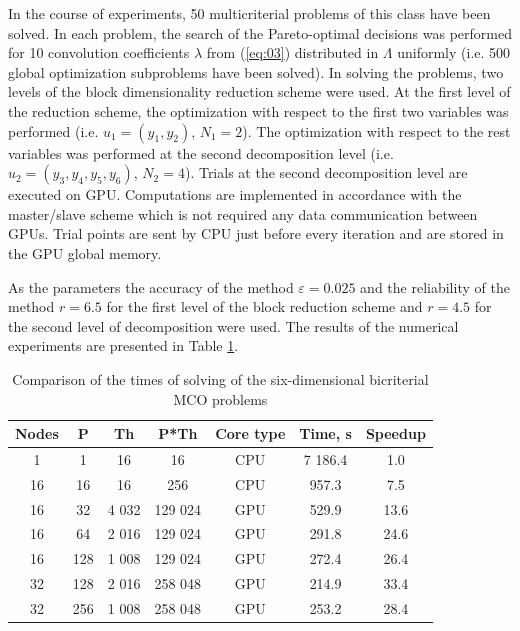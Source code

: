 \documentclass[runningheads]{llncs}
\begin{document}
In the course of experiments, 50 multicriterial problems of this class have been solved. In each problem, the search of the Pareto-optimal decisions was performed for 10 convolution coefficients $\lambda$ from (\ref{eq:03}) distributed in $\Lambda$ uniformly (i.e. 500 global optimization subproblems have been solved). In solving the problems, two levels of the block dimensionality reduction scheme were used. At the first level of the reduction scheme, the optimization with respect to the first two variables was performed (i.e. $u_1 = (y_1, y_2)$, $N_1=2$). The optimization with respect to the rest variables was performed at the second decomposition level (i.e. $u_2 = (y_3, y_4, y_5, y_6)$, $N_2=4$). Trials at the second decomposition level are executed on GPU. Computations are implemented in accordance with the master/slave scheme which is not required any data communication between GPUs. Trial points are sent by CPU just before every iteration and are stored in the GPU global memory.

As the parameters the accuracy of the method $\varepsilon=0.025$ and the reliability of the method $r=6.5$ for the first level of the block reduction scheme and $r=4.5$ for the second level of decomposition were used. The results of the numerical experiments are presented in Table \ref{tab:02}.

\begin{table}[htbp]
\centering
\caption{Comparison of the times of solving of the six-dimensional bicriterial MCO problems}
\label{tab:02}
\begin{tabular}{ccccccc}
\hline
\textbf{Nodes} & \textbf{P} & \textbf{Th} & \textbf{P*Th} & \textbf{Core type} & \textbf{Time, s} & \textbf{Speedup} \\ \hline
1              & 1          & 16          & 16            & CPU                   & 7 186.4          & 1.0              \\
16             & 16         & 16          & 256           & CPU                   & 957.3            & 7.5              \\
16             & 32         & 4 032       & 129 024       & GPU                   & 529.9            & 13.6             \\
16             & 64         & 2 016       & 129 024       & GPU                   & 291.8            & 24.6             \\
16             & 128        & 1 008       & 129 024       & GPU                   & 272.4            & 26.4             \\
32             & 128        & 2 016       & 258 048       & GPU                   & 214.9            & 33.4             \\
32             & 256        & 1 008       & 258 048       & GPU                   & 253.2            & 28.4             \\ \hline
\end{tabular}
\end{table}
\end{document}
